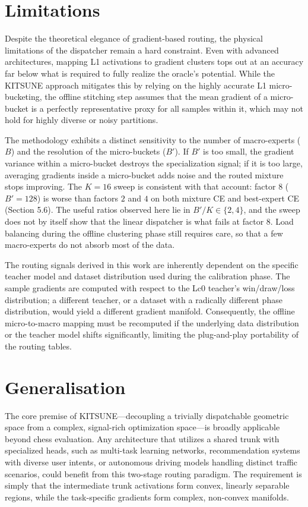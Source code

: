 \section{Limitations}
Despite the theoretical elegance of gradient-based routing, the physical limitations of the dispatcher remain a hard constraint. Even with advanced architectures, mapping L1 activations to gradient clusters tops out at an accuracy far below what is required to fully realize the oracle's potential. While the KITSUNE approach mitigates this by relying on the highly accurate L1 micro-bucketing, the offline stitching step assumes that the mean gradient of a micro-bucket is a perfectly representative proxy for all samples within it, which may not hold for highly diverse or noisy partitions.

The methodology exhibits a distinct sensitivity to the number of macro-experts ($B$) and the resolution of the micro-buckets ($B'$). If $B'$ is too small, the gradient variance within a micro-bucket destroys the specialization signal; if it is too large, averaging gradients inside a micro-bucket adds noise and the routed mixture stops improving. The $K=16$ sweep is consistent with that account: factor $8$ ($B'=128$) is worse than factors $2$ and $4$ on both mixture CE and best-expert CE (Section 5.6). The useful ratios observed here lie in $B'/K \in \{2, 4\}$, and the sweep does not by itself show that the linear dispatcher is what fails at factor $8$. Load balancing during the offline clustering phase still requires care, so that a few macro-experts do not absorb most of the data.

The routing signals derived in this work are inherently dependent on the specific teacher model and dataset distribution used during the calibration phase. The sample gradients are computed with respect to the Lc0 teacher's win/draw/loss distribution; a different teacher, or a dataset with a radically different phase distribution, would yield a different gradient manifold. Consequently, the offline micro-to-macro mapping must be recomputed if the underlying data distribution or the teacher model shifts significantly, limiting the plug-and-play portability of the routing tables.

\section{Generalisation}
The core premise of KITSUNE---decoupling a trivially dispatchable geometric space from a complex, signal-rich optimization space---is broadly applicable beyond chess evaluation. Any architecture that utilizes a shared trunk with specialized heads, such as multi-task learning networks, recommendation systems with diverse user intents, or autonomous driving models handling distinct traffic scenarios, could benefit from this two-stage routing paradigm. The requirement is simply that the intermediate trunk activations form convex, linearly separable regions, while the task-specific gradients form complex, non-convex manifolds.

